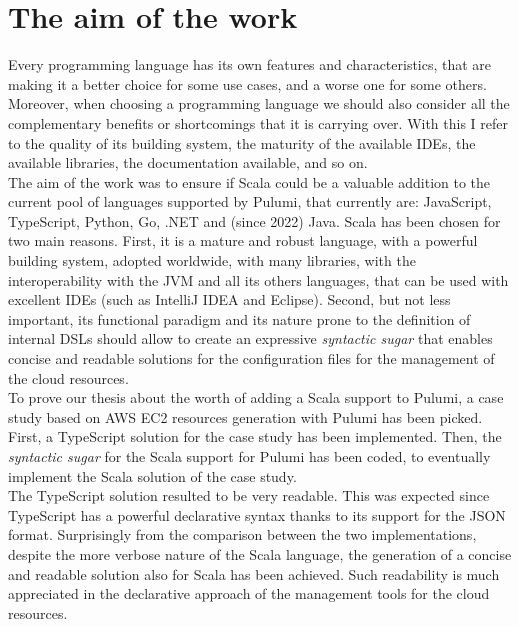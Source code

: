 \section{The aim of the work}
Every programming language has its own features and characteristics, that are making it a better choice for some use cases, and a worse one for some others.
Moreover, when choosing a programming language we should also consider all the complementary benefits or shortcomings that it is carrying over.
With this I refer to the quality of its building system, the maturity of the available IDEs, the available libraries, the documentation available, and so on.\\
The aim of the work was to ensure if Scala could be a valuable addition to the current pool of languages supported by Pulumi, that currently are: JavaScript, TypeScript, Python, Go, .NET and  (since 2022) Java.
Scala has been chosen for two main reasons.
First, it is a mature and robust language, with a powerful building system, adopted worldwide, with many libraries, with the interoperability with the JVM and all its others languages, that can be used with excellent IDEs (such as IntelliJ IDEA and Eclipse).
Second, but not less important, its functional paradigm and its nature prone to the definition of \gls{internal DSL}s should allow to create an expressive \textit{syntactic sugar} that enables concise and readable solutions for the configuration files for the management of the cloud resources.\\
To prove our thesis about the worth of adding a Scala support to Pulumi, a case study based on AWS EC2 resources generation with Pulumi has been picked.
First, a TypeScript solution for the case study has been implemented.
Then, the \textit{syntactic sugar} for the Scala support for Pulumi has been coded, to eventually implement the Scala solution of the case study.\\
The TypeScript solution resulted to be very readable. This was expected since TypeScript has a powerful declarative syntax thanks to its support for the JSON format.
Surprisingly from the comparison between the two implementations, despite the more verbose nature of the Scala language, the generation of a concise and readable solution also for Scala has been achieved.
Such readability is much appreciated in the declarative approach of the management tools for the cloud resources.
